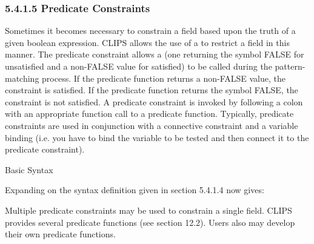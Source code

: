 \documentclass[letterpaper,10pt,english]{sphinxmanual}
\begin{document}
\subsubsection{5.4.1.5 Predicate Constraints}
\label{\detokenize{defrule:predicate-constraints}}
Sometimes it becomes necessary to constrain a field based upon the truth
of a given boolean expression. CLIPS allows the use of a  to restrict a field in this manner. The predicate
constraint allows a  (one returning the symbol
FALSE for unsatisfied and a non-FALSE value for satisfied) to be called
during the pattern-matching process. If the predicate function returns a
non-FALSE value, the constraint is satisfied. If the predicate function
returns the symbol FALSE, the constraint is not satisfied. A predicate
constraint is invoked by following a colon with an appropriate function
call to a predicate function. Typically, predicate constraints are used
in conjunction with a connective constraint and a variable binding (i.e.
you have to bind the variable to be tested and then connect it to the
predicate constraint).

Basic Syntax

\begin{sphinxVerbatim}[commandchars=\\\{\}]
\end{sphinxVerbatim}

Expanding on the syntax definition given in section 5.4.1.4 now gives:


\begin{sphinxVerbatim}[commandchars=\\\{\}]
   
   
    
\end{sphinxVerbatim}

Multiple predicate constraints may be used to constrain a single field.
CLIPS provides several predicate functions (see section 12.2). Users
also may develop their own predicate functions.
\end{document}
